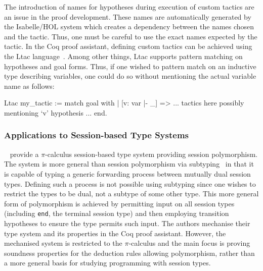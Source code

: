 The introduction of names for hypotheses during execution of custom tactics
are an issue in the proof development. These names are automatically generated
by the Isabelle/HOL system which creates a dependency between the names chosen
and the tactic. Thus, one must be careful to use the exact names expected by
the tactic. In the Coq proof assistant, defining custom tactics can be
achieved using the Ltac language~\cite{Delahaye:2000:TLS}. Among other things,
Ltac supports pattern matching on hypotheses and goal forms. Thus, if one
wished to pattern match on an inductive type describing variables, one could
do so without mentioning the actual variable name as follows:

\begin{coq}
Ltac my_tactic :=
  match goal with
  | [v: var |- _] =>
    ... tactics here possibly mentioning `v' hypothesis ...
  end.
\end{coq}

\subsubsection{Applications to Session-based Type Systems}\label{sec:asts}

\citeauthor{Goto:2014}~\cite{Goto:2014} provide a $\pi$-calculus session-based
type system providing session polymorphism. The system is more general than
session polymorphism via subtyping~\cite{Gay:2005:SST} in that it is capable
of typing a generic forwarding process between mutually dual session
types. Defining such a process is not possible using subtyping since one
wishes to restrict the types to be dual, not a subtype of some other
type. This more general form of polymorphism is achieved by permitting input
on all session types (including \lstinline{end}, the terminal session type)
and then employing transition hypotheses to ensure the type permits such
input. The authors mechanise their type system and its properties in the Coq
proof assistant. However, the mechanised system is restricted to the
$\pi$-calculus and the main focus is proving soundness properties for the
deduction rules allowing polymorphism, rather than a more general basis for
studying programming with session types.
